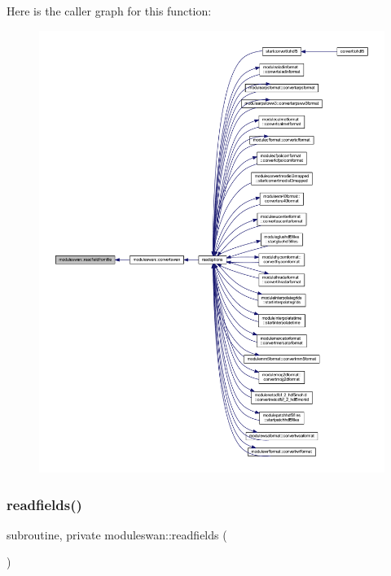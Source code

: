 Here is the caller graph for this function\+:\nopagebreak
\begin{figure}[H]
\begin{center}
\leavevmode
\includegraphics[width=350pt]{namespacemoduleswan_a3ba6a86cf192c42aac83c6a40c7addbc_icgraph}
\end{center}
\end{figure}
\mbox{\label{namespacemoduleswan_a247f3ff2e64affcc137e817aadef34dc}} 
\subsubsection{\texorpdfstring{readfields()}{readfields()}}
{\footnotesize\ttfamily subroutine, private moduleswan\+::readfields (\begin{DoxyParamCaption}{ }\end{DoxyParamCaption})\hspace{0.3cm}{\ttfamily [private]}}

